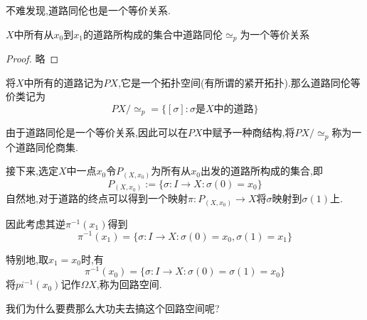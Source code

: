 \documentclass{article}
\begin{document}
不难发现,道路同伦也是一个等价关系.
\begin{proposition}
    $X$中所有从$x_0$到$x_1$的道路所构成的集合中道路同伦$\simeq_p$为一个等价关系
\end{proposition}
\begin{proof}
    略
\end{proof}
\begin{definition}
    将$X$中所有的道路记为$PX$,它是一个拓扑空间(有所谓的紧开拓扑).那么道路同伦等价类记为
    $$
    PX /\simeq_p  = \{[\sigma]:\sigma \text{是}X\text{中的道路}\}
    $$
\end{definition}

由于道路同伦是一个等价关系,因此可以在$PX$中赋予一种商结构,将$PX/\simeq_p$称为一个道路同伦商集.


接下来,选定$X$中一点$x_0$令$P_{(X,x_0)}$为所有从$x_0$出发的道路所构成的集合,即
$$
P_{(X,x_0)} := \{\sigma : I \to X : \sigma(0) = x_0\}
$$
自然地,对于道路的终点可以得到一个映射$\pi : P_{(X,x_0)}\to X$将$\sigma$映射到$\sigma(1)$上.


因此考虑其逆$\pi^{-1}(x_1)$得到
$$
\pi^{-1}(x_1) = \{\sigma : I \to X : \sigma(0) = x_0,\sigma(1) = x_1\}
$$

特别地,取$x_1 = x_0$时,有
$$
\pi^{-1}(x_0) = \{\sigma : I \to X : \sigma(0) = \sigma(1) = x_0\}
$$
将$pi^{-1}(x_0)$记作$\Omega X$,称为回路空间.


我们为什么要费那么大功夫去搞这个回路空间呢?
\end{document}
